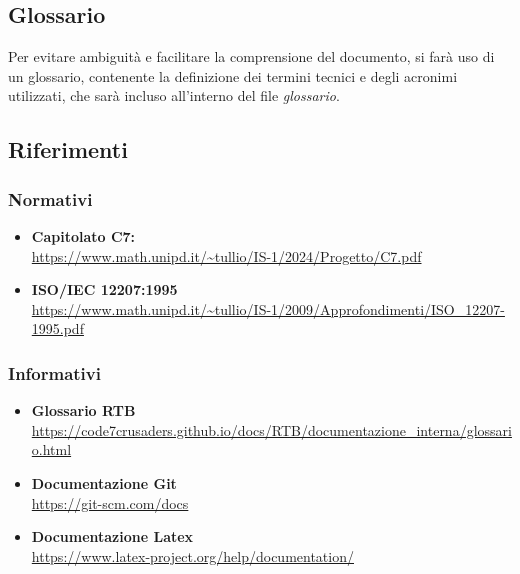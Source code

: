 \subsection{Glossario}
Per evitare ambiguità e facilitare la comprensione del documento, si farà uso di un glossario, 
contenente la definizione dei termini tecnici e degli acronimi utilizzati, 
che sarà incluso all'interno del file \textit{glossario}.


\subsection{Riferimenti}
\subsubsection{Normativi}
\begin{itemize}
	\item \textbf{Capitolato C7:} \\ \url{https://www.math.unipd.it/~tullio/IS-1/2024/Progetto/C7.pdf}
	\item \textbf{ISO/IEC 12207:1995} \\ \url{https://www.math.unipd.it/~tullio/IS-1/2009/Approfondimenti/ISO_12207-1995.pdf}
\end{itemize}

\subsubsection{Informativi}
\begin{itemize}
    \item\textbf{Glossario RTB}\\ \url{https://code7crusaders.github.io/docs/RTB/documentazione_interna/glossario.html}
    \item\textbf{Documentazione Git}\\ \url{https://git-scm.com/docs}
    \item\textbf{Documentazione Latex}\\ \url{https://www.latex-project.org/help/documentation/}

\end{itemize}
